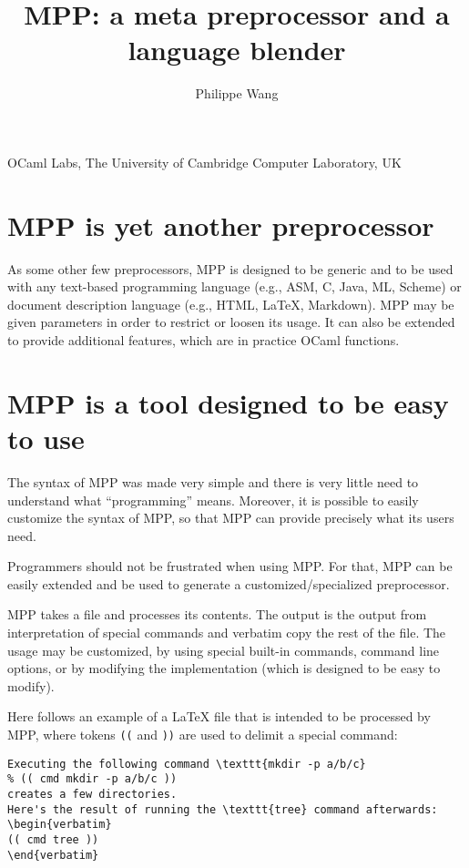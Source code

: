 \documentclass[a4paper]{article}
\title{MPP: a meta preprocessor and a language blender}
\author{Philippe Wang}
\date{}
\begin{document}
\maketitle
\begin{center}
  OCaml Labs, 
  The University of Cambridge Computer Laboratory, UK\\
\end{center}
\section{MPP is yet another preprocessor}
As some other few preprocessors, MPP
is  designed  to  be  generic  and  to be  used  with  any  text-based
programming  language (e.g.,  ASM, C,  Java, ML,  Scheme)  or document
description language  (e.g., HTML, LaTeX, Markdown). MPP  may be given
parameters in  order to restrict or  loosen its usage. It  can also be
extended to provide additional features, which  are in practice OCaml functions.

\section{MPP is a tool designed to be easy to use}

The syntax of MPP was made very simple and there is very little need
to understand what ``programming'' means.  Moreover, it is possible to
easily customize the syntax of MPP, so that MPP can provide precisely
what its users need.

Programmers should not be frustrated when using MPP. For that, MPP can
be easily  extended and be  used to generate  a customized/specialized
preprocessor.

MPP takes a file and processes its contents.  The output is the output
from interpretation of special commands  and verbatim copy the rest of
the  file.  The  usage may  be customized,  by using  special built-in
commands,  command line  options, or  by modifying  the implementation
(which is designed to be easy to modify).

Here  follows an  example  of a  LaTeX  file that  is  intended to  be
processed by MPP, where tokens \texttt{((} and \texttt{))} are used to
delimit a special command:
\begin{lstlisting}
Executing the following command \texttt{mkdir -p a/b/c} 
% (( cmd mkdir -p a/b/c ))
creates a few directories.
Here's the result of running the \texttt{tree} command afterwards:
\begin{verbatim}
(( cmd tree ))
\end{verbatim}
\end{lstlisting}
\end{document}
